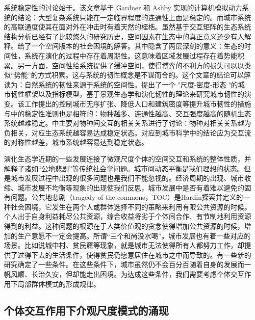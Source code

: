 系统稳定性的讨论始于\cite{may1972will}。该文章基于 Gardner 和 Ashby 实现的计算机模拟动力系统的结论：大型复杂系统只能在一定临界程度的连通性上面是稳定的。而城市系统的高联通度使其在面对外在冲击时有着天然的桎梏。虽然基于交互矩阵的生态系统结构分析已经有了比较悠久的研究历史，空间因素在生态中的真正意义还少有人解释。\cite{lin2019spatial}给了一个空间版本的社会困境的解答。其中隐含了两层深刻的意义：生态的时间性，系统在演化的过程中存在着周期性。这意味着区域发展过程存在着势能积累。另一方面，空间性给系统提供了缓冲空间，使得博弈的不利方的损失可以以类似“势能”的方式积累。这与系统的韧性\cite{gao2016universal}概念是不谋而合的。这个文章的结论可以解读为：自然系统的韧性来源于系统的空间性。\cite{feng2020comprehensive}提出了一个 "尺度-密度-形态 "的城市韧性框架以及指标模型，基于景观生态学和演化韧性的理论来研究城市韧性的演变。该工作提出的控制城市无序扩张、降低人口和建筑密度等提升城市韧性的措施与\cite{may1972will}中的稳定性准则也是相符的：物种越多、连通性越高、交互强度越高的随机生态系统越难稳定。\cite{allesina2012stability}中主要对物种间交互的相关关系进行了讨论：物种对相关关系越为负相关，对应生态系统越容易达成稳定状态。对应到城市科学中的结论应为交互流的对称性越差，城市系统越容易达到稳定状态。

演化生态学近期的一些发展连接了微观尺度个体的空间交互和系统的整体性质，并解释了诸如“公地悲剧”等传统社会学问题。城市间动态平衡是我们理想的状态。但是城市发展过程中出现的很多问题也是我们不能忽视的。经济周期的出现、城市收缩、城市发展不均衡等现象的出现使我们反思，城市发展中是否有着难以避免的固有问题。公共地悲剧（tragedy of the commons，TOC）是Hardin\cite{hardin1968tragedy}探索并定义的一种社会困境，它发生在两个人或群体选择不同的策略来利用有限公共资源的时候。个人出于自身利益耗尽公共资源，综合收益将劣于个体间合作、有节制地利用资源得到的利益。这种问题的根源在于人类价值观的贪念使得增加公共资源的时候，增加的生产意愿不一定会提高。所谓“三个和尚没水喝”。城市发展也有着一些对应的场景。比如说城中村、贫民窟等现象，就是城市无法使得所有人都努力工作，却提供了过得下去的生活条件，使得贫民仍愿意居住在城市之中而导致的。有一些新的研究确定了一些条件。在这些条件下，城市虽然仍不会百分百随着自身的发展而一帆风顺、长治久安，但却能走出困境\cite{lin2019spatial}。为达成这些条件，我们需要考虑个体交互作用下局部群体模式的形成规律。

\subsection{个体交互作用下介观尺度模式的涌现}

